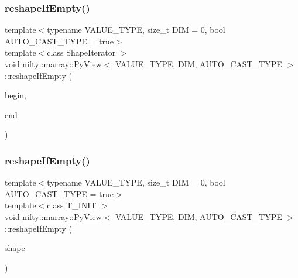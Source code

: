 \mbox{\label{classnifty_1_1marray_1_1PyView_a2141d44a685df3c8f24afafc76c86197}} 
\subsubsection{\texorpdfstring{reshape\+If\+Empty()}{reshapeIfEmpty()}\hspace{0.1cm}{\footnotesize\ttfamily [1/2]}}
{\footnotesize\ttfamily template$<$typename V\+A\+L\+U\+E\+\_\+\+T\+Y\+PE, size\+\_\+t D\+IM = 0, bool A\+U\+T\+O\+\_\+\+C\+A\+S\+T\+\_\+\+T\+Y\+PE = true$>$ \\
template$<$class Shape\+Iterator $>$ \\
void \hyperlink{classnifty_1_1marray_1_1PyView}{nifty\+::marray\+::\+Py\+View}$<$ V\+A\+L\+U\+E\+\_\+\+T\+Y\+PE, D\+IM, A\+U\+T\+O\+\_\+\+C\+A\+S\+T\+\_\+\+T\+Y\+PE $>$\+::reshape\+If\+Empty (\begin{DoxyParamCaption}\item[{Shape\+Iterator}]{begin,  }\item[{Shape\+Iterator}]{end }\end{DoxyParamCaption})\hspace{0.3cm}{\ttfamily [inline]}}

\mbox{\label{classnifty_1_1marray_1_1PyView_a88cd936f03f7f4ba07ee7eb4dce4f6eb}} 
\subsubsection{\texorpdfstring{reshape\+If\+Empty()}{reshapeIfEmpty()}\hspace{0.1cm}{\footnotesize\ttfamily [2/2]}}
{\footnotesize\ttfamily template$<$typename V\+A\+L\+U\+E\+\_\+\+T\+Y\+PE, size\+\_\+t D\+IM = 0, bool A\+U\+T\+O\+\_\+\+C\+A\+S\+T\+\_\+\+T\+Y\+PE = true$>$ \\
template$<$class T\+\_\+\+I\+N\+IT $>$ \\
void \hyperlink{classnifty_1_1marray_1_1PyView}{nifty\+::marray\+::\+Py\+View}$<$ V\+A\+L\+U\+E\+\_\+\+T\+Y\+PE, D\+IM, A\+U\+T\+O\+\_\+\+C\+A\+S\+T\+\_\+\+T\+Y\+PE $>$\+::reshape\+If\+Empty (\begin{DoxyParamCaption}\item[{std\+::initializer\+\_\+list$<$ T\+\_\+\+I\+N\+IT $>$}]{shape }\end{DoxyParamCaption})\hspace{0.3cm}{\ttfamily [inline]}}



